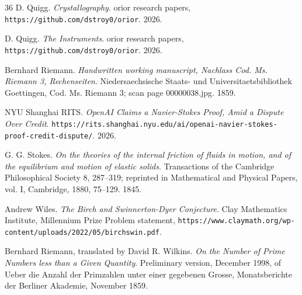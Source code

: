 \begin{thebibliography}{36}
D. Quigg. \emph{Crystallography}. orior research papers, \texttt{https:/\allowbreak{}/\allowbreak{}github.com/\allowbreak{}dstroy0/\allowbreak{}orior}. 2026.

D. Quigg. \emph{The Instruments}. orior research papers, \texttt{https:/\allowbreak{}/\allowbreak{}github.com/\allowbreak{}dstroy0/\allowbreak{}orior}. 2026.

Bernhard Riemann. \emph{Handwritten working manuscript, Nachlass Cod. Ms. Riemann 3, Rechenseiten}. Niedersaechsische Staats- und Universitaetsbibliothek Goettingen, Cod. Ms. Riemann 3; scan page 00000038.jpg. 1859.

NYU Shanghai RITS. \emph{OpenAI Claims a Navier-Stokes Proof, Amid a Dispute Over Credit}. \texttt{https:/\allowbreak{}/\allowbreak{}rits.shanghai.nyu.edu/\allowbreak{}ai/\allowbreak{}openai-navier-stokes-proof-credit-dispute/}. 2026.

G. G. Stokes. \emph{On the theories of the internal friction of fluids in motion, and of the equilibrium and motion of elastic solids}. Transactions of the Cambridge Philosophical Society 8, 287--319; reprinted in Mathematical and Physical Papers, vol. I, Cambridge, 1880, 75--129. 1845.

Andrew Wiles. \emph{The Birch and Swinnerton-Dyer Conjecture}. Clay Mathematics Institute, Millennium Prize Problem statement, \texttt{https:/\allowbreak{}/\allowbreak{}www.claymath.org/\allowbreak{}wp-content/\allowbreak{}uploads/\allowbreak{}2022/\allowbreak{}05/\allowbreak{}birchswin.pdf}.

Bernhard Riemann, translated by David R. Wilkins. \emph{On the Number of Prime Numbers less than a Given Quantity}. Preliminary version, December 1998, of Ueber die Anzahl der Primzahlen unter einer gegebenen Grosse, Monatsberichte der Berliner Akademie, November 1859.

\end{thebibliography}
